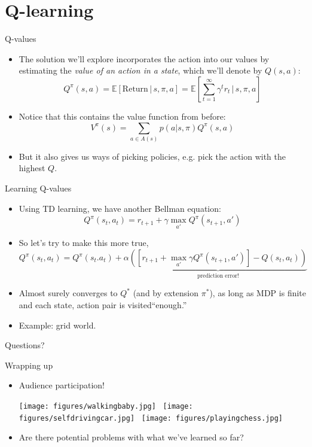 \documentclass[handout]{beamer} %
\newcommand{\E}[1]{\mathbb{E}\left[#1\right]}
\begin{document}
\section{Q-learning}


\begin{frame}{Q-values}
\begin{itemize}
\item The solution we'll explore incorporates the action into our values by estimating the \emph{value of an action in a state}, which we'll denote by \(Q(s,a)\):
    \[Q^\pi(s,a) = \E{\text{Return} \, |\, s, \pi, a} = \E{\sum_{t=1}^\infty \gamma^t r_t \, \bigg \vert \, s, \pi, a } \]
\item<2-> Notice that this contains the value function from before:
    \[V^\pi(s) = \sum_{a \in A(s)} p(a | s, \pi) Q^{\pi} (s, a)\]
\item<3-> But it also gives us ways of picking policies, e.g. pick the action with the highest \(Q\).
\end{itemize}
\end{frame}

\begin{frame}{Learning Q-values}
\begin{itemize}
    \item<1-> Using TD learning, we have another Bellman equation:
        \[Q^{\pi}\left(s_{t}, a_t\right) = r_{t+1} + \gamma \max_{a'} Q^{\pi}\left(s_{t+1}, a'\right) \] 
    \item<2-> So let's try to make this more true, 
        {\small
        \[Q^{\pi}(s_{t}, a_t) = Q^{\pi}(s_t. a_t) + \alpha \underbrace{\left( \left[ r_{t+1} + \max_{a'} \gamma Q^{\pi}(s_{t+1}, a') \right] - Q(s_t, a_t)\right)}_{\text{prediction error!}}\]}
    \item<3-> Almost surely converges to \(Q^*\) (and by extension \(\pi^*\)), as long as MDP is finite and each state, action pair is visited``enough.'' 
    \item<4-> Example: grid world.
\end{itemize}
\end{frame}

\begin{frame}[standout]
Questions?
\end{frame}

\begin{frame}{Wrapping up}
\begin{itemize}
    \item Audience participation!
    \begin{center}
        \texttt{[image: figures/walkingbaby.jpg]}~
        \texttt{[image: figures/selfdrivingcar.jpg]}~
        \texttt{[image: figures/playingchess.jpg]}
    \end{center}
    \item<2-> Are there potential problems with what we've learned so far?
    
\end{itemize}
\end{frame}
\end{document}
